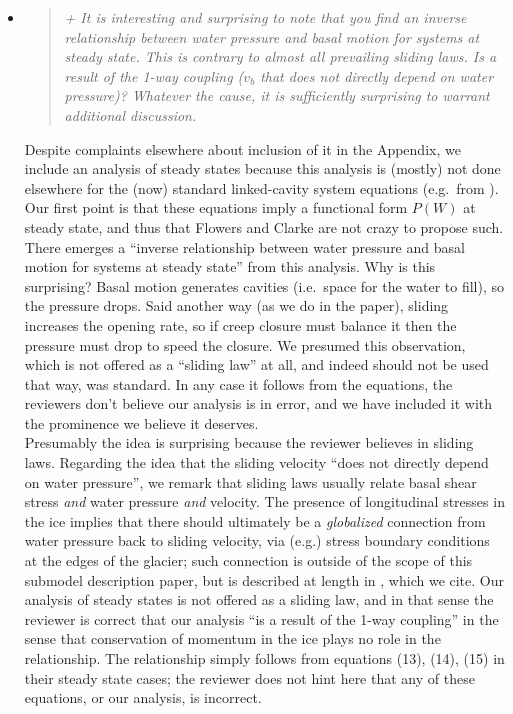 \documentclass[11pt,reqno]{amsart}
\newcommand{\reply}[2]{
\medskip\medskip
\item  \begin{quote}
\emph{#1}
\end{quote}

\medskip
\noindent #2}
\begin{document}
\begin{itemize}
\reply{+ It is interesting and surprising to note that you find an inverse relationship between
water pressure and basal motion for systems at steady state. This is contrary to almost
all prevailing sliding laws. Is a result of the 1-way coupling ($v_b$ that does not directly
depend on water pressure)? Whatever the cause, it is sufficiently surprising to warrant
additional discussion.}
{Despite complaints elsewhere about inclusion of it in the Appendix, we include an analysis of steady states because this analysis is (mostly) not done elsewhere for the (now) standard linked-cavity system equations (e.g.~from \cite{Hewitt2011,Schoofetal2012}).  Our first point is that these equations imply a functional form $P(W)$ at steady state, and thus that Flowers and Clarke \cite{FlowersClarke2002} are not crazy to propose such.\\
\indent There emerges a ``inverse relationship between water pressure and basal motion for systems at steady state'' from this analysis.  Why is this surprising?  Basal motion generates cavities (i.e.~space for the water to fill), so the pressure drops.  Said another way (as we do in the paper), sliding increases the opening rate, so if creep closure must balance it then the pressure must drop to speed the closure.  We presumed this observation, which is not offered as a ``sliding law'' at all, and indeed should not be used that way, was standard.  In any case it follows from the equations, the reviewers don't believe our analysis is in error, and we have included it with the prominence we believe it deserves. \\
\indent Presumably the idea is surprising because the reviewer believes in sliding laws.  Regarding the idea that the sliding velocity ``does not directly
depend on water pressure'', we remark that sliding laws usually relate basal shear stress \emph{and} water pressure \emph{and} velocity.  The presence of longitudinal stresses in the ice implies that there should ultimately be a \emph{globalized} connection from water pressure back to sliding velocity, via (e.g.) stress boundary conditions at the edges of the glacier; such connection is outside of the scope of this submodel description paper, but is described at length in \cite{BBssasliding}, which we cite.  Our analysis of steady states is not offered as a sliding law, and in that sense the reviewer is correct that our analysis ``is a result of the 1-way coupling'' in the sense that conservation of momentum in the ice plays no role in the relationship.  The relationship simply follows from equations (13), (14), (15) in their steady state cases; the reviewer does not hint here that any of these equations, or our analysis, is incorrect.}


\end{itemize}
\end{document}
